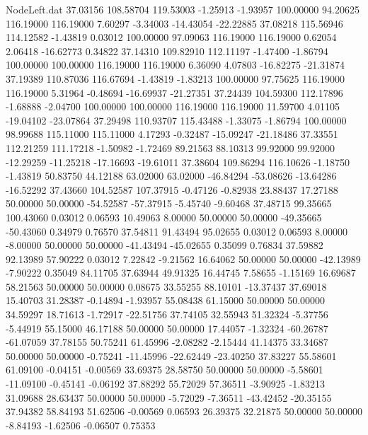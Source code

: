 \begin{filecontents}{NodeLeft.dat}
  37.03156  108.58704  119.53003    -1.25913   -1.93957  100.00000   94.20625  116.19000  116.19000    7.60297   -3.34003  -14.43054  -22.22885
  37.08218  115.56946  114.12582    -1.43819    0.03012  100.00000   97.09063  116.19000  116.19000    0.62054    2.06418  -16.62773    0.34822
  37.14310  109.82910  112.11197    -1.47400   -1.86794  100.00000  100.00000  116.19000  116.19000    6.36090    4.07803  -16.82275  -21.31874
  37.19389  110.87036  116.67694    -1.43819   -1.83213  100.00000   97.75625  116.19000  116.19000    5.31964   -0.48694  -16.69937  -21.27351
  37.24439  104.59300  112.17896    -1.68888   -2.04700  100.00000  100.00000  116.19000  116.19000   11.59700    4.01105  -19.04102  -23.07864
  37.29498  110.93707  115.43488    -1.33075   -1.86794  100.00000   98.99688  115.11000  115.11000    4.17293   -0.32487  -15.09247  -21.18486
  37.33551  112.21259  111.17218    -1.50982   -1.72469   89.21563   88.10313   99.92000   99.92000  -12.29259  -11.25218  -17.16693  -19.61011
  37.38604  109.86294  116.10626    -1.18750   -1.43819   50.83750   44.12188   63.02000   63.02000  -46.84294  -53.08626  -13.64286  -16.52292
  37.43660  104.52587  107.37915    -0.47126   -0.82938   23.88437   17.27188   50.00000   50.00000  -54.52587  -57.37915   -5.45740   -9.60468
  37.48715   99.35665  100.43060     0.03012    0.06593   10.49063    8.00000   50.00000   50.00000  -49.35665  -50.43060    0.34979    0.76570
  37.54811   91.43494   95.02655     0.03012    0.06593    8.00000   -8.00000   50.00000   50.00000  -41.43494  -45.02655    0.35099    0.76834
  37.59882   92.13989   57.90222     0.03012    7.22842   -9.21562   16.64062   50.00000   50.00000  -42.13989   -7.90222    0.35049   84.11705
  37.63944   49.91325   16.44745     7.58655   -1.15169   16.69687   58.21563   50.00000   50.00000    0.08675   33.55255   88.10101  -13.37437
  37.69018   15.40703   31.28387    -0.14894   -1.93957   55.08438   61.15000   50.00000   50.00000   34.59297   18.71613   -1.72917  -22.51756
  37.74105   32.55943   51.32324    -5.37756   -5.44919   55.15000   46.17188   50.00000   50.00000   17.44057   -1.32324  -60.26787  -61.07059
  37.78155   50.75241   61.45996    -2.08282   -2.15444   41.14375   33.34687   50.00000   50.00000   -0.75241  -11.45996  -22.62449  -23.40250
  37.83227   55.58601   61.09100    -0.04151   -0.00569   33.69375   28.58750   50.00000   50.00000   -5.58601  -11.09100   -0.45141   -0.06192
  37.88292   55.72029   57.36511    -3.90925   -1.83213   31.09688   28.63437   50.00000   50.00000   -5.72029   -7.36511  -43.42452  -20.35155
  37.94382   58.84193   51.62506    -0.00569    0.06593   26.39375   32.21875   50.00000   50.00000   -8.84193   -1.62506   -0.06507    0.75353

\end{filecontents}
